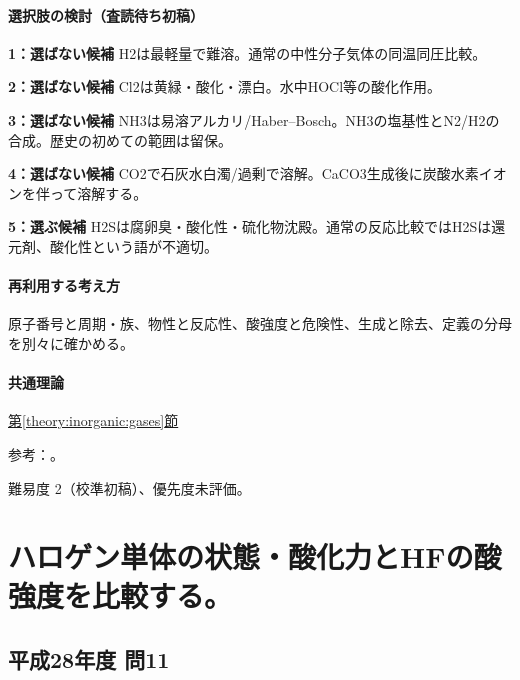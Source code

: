 \paragraph{選択肢の検討（査読待ち初稿）}\mbox{}\par

\noindent\textbf{1：選ばない候補} H2は最軽量で難溶。通常の中性分子気体の同温同圧比較。\par

\noindent\textbf{2：選ばない候補} Cl2は黄緑・酸化・漂白。水中HOCl等の酸化作用。\par

\noindent\textbf{3：選ばない候補} NH3は易溶アルカリ/Haber–Bosch。NH3の塩基性とN2/H2の合成。歴史の初めての範囲は留保。\par

\noindent\textbf{4：選ばない候補} CO2で石灰水白濁/過剰で溶解。CaCO3生成後に炭酸水素イオンを伴って溶解する。\par

\noindent\textbf{5：選ぶ候補} H2Sは腐卵臭・酸化性・硫化物沈殿。通常の反応比較ではH2Sは還元剤、酸化性という語が不適切。\par

\paragraph{再利用する考え方} 原子番号と周期・族、物性と反応性、酸強度と危険性、生成と除去、定義の分母を別々に確かめる。

\paragraph{共通理論} \hyperref[theory:inorganic:gases]{第\ref*{theory:inorganic:gases}節}

\par 参考：\cite{inorganic_halogen_ref,inorganic_hydrogen_ref}。

\par 難易度 2（校準初稿）、優先度未評価。

\section{ハロゲン単体の状態・酸化力とHFの酸強度を比較する。}

\subsection{平成28年度 問11}
\label{q:h28-reg-applied-11}

